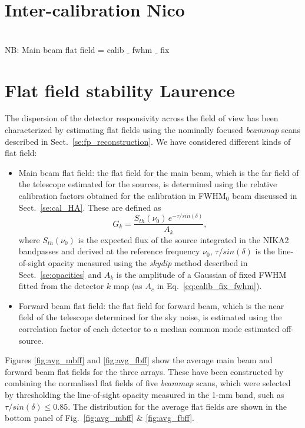 
\section{Inter-calibration {\color{blue} Nico}}
\label{se:intercalibration}

 \\

{\color{blue} NB: Main beam flat field = calib $\_$ fwhm $\_$ fix}


\section{Flat field stability {\color{LimeGreen} Laurence} }
\label{se:flatfields}

The dispersion of the detector responsivity across the field of view has been characterized by estimating flat fields using the nominally focused \emph{beammap} scans described in Sect.~\ref{se:fp_reconstruction}. We have considered different kinds of flat field:
\begin{itemize}
\item Main beam flat field: the flat field for the main beam, which is the far field of the telescope estimated for the sources, is determined using the relative calibration factors obtained for the calibration in FWHM$_{0}$ beam discussed in Sect.~\ref{se:cal_HA}. These are defined as
  \begin{equation}
    G_k = \frac{S_{th}(\nu_0)\, e^{-\tau/sin(\delta)}}{A_k}, 
  \end{equation}
  where $S_{th}(\nu_0)$ is the expected flux of the source integrated in the NIKA2 bandpasses and derived at the reference frequency $\nu_0$, $\tau/sin(\delta)$ is the line-of-sight opacity measured using the \emph{skydip} method described in Sect.~\ref{se:opacities} and $A_k$ is the amplitude of a Gaussian of fixed FWHM fitted from the detector $k$ map (as $A_{c}$ in Eq.~\ref{eq:calib_fix_fwhm}).
\item Forward beam flat field: the flat field for forward beam, which is the near field of the telescope determined for the sky noise, is estimated using the correlation factor of each detector to a median common mode estimated off-source.
\end{itemize}

Figures \ref{fig:avg_mbff} and \ref{fig:avg_fbff} show the average main beam and forward beam flat fields for the three arrays. These have been constructed by combining the normalised flat fields of five \emph{beammap} scans, which were selected by thresholding the line-of-sight opacity measured in the 1-mm band, such as $\tau/sin(\delta) \leq 0.85$. The distribution for the average flat fields are shown in the bottom panel of Fig.~\ref{fig:avg_mbff} $\&$ \ref{fig:avg_fbff}.

